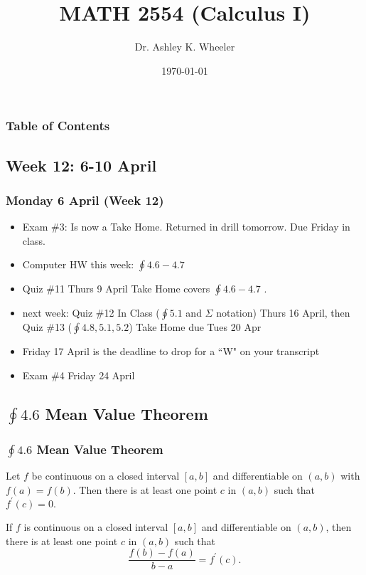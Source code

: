 \documentclass[14pt]{beamer}
\title[Cal I S2015]{MATH 2554 (Calculus I)}
\subtitle{}
\author[Wheeler]{Dr. Ashley K. Wheeler}
\institute{University of Arkansas}
\date{\today}
\begin{document}
\maketitle

\begin{frame}
\frametitle{Table of Contents}
\tableofcontents
\end{frame}


\begin{frame}
\section[Week 12]{Week 12: 6-10 April}
\frametitle{Monday 6 April (Week 12)}
\small
\begin{itemize}
\item Exam \#3: Is now a Take Home.  Returned in drill tomorrow.  Due Friday in class.
\item Computer HW this week: $\oint 4.6-4.7$ 	
\item Quiz \#11 Thurs 9 April Take Home covers $\oint 4.6-4.7$ .
\item next week: Quiz \#12 In Class ($\oint 5.1$ and $\Sigma$ notation) Thurs 16 April, then Quiz \#13 ($\oint 4.8, 5.1, 5.2$) Take Home due Tues 20 Apr
\item \alert{Friday 17 April is the deadline to drop for a ``W" on your transcript}
\item Exam \#4 Friday 24 April
\end{itemize}
\end{frame}

\begin{frame}
\subsection[$\oint 4.6$ Mean Value Theorem]{$\oint 4.6$ Mean Value Theorem}
\frametitle{$\oint 4.6$ Mean Value Theorem}
\small 
\begin{thm}  Let $f$ be continuous on a closed interval $[a,b]$ and differentiable on $(a,b)$ with $f(a)=f(b)$.  Then there is at least one point $c$ in $(a,b)$ such that $f^{\prime}(c)=0.$ \end{thm}

\vspace{1pc}
\begin{thm}  If $f$ is continuous on a closed interval $[a,b]$ and differentiable on $(a,b)$, then there is at least one point $c$ in $(a,b)$ such that 
$$\frac{f(b)-f(a)}{b-a}=f^{\prime}(c).$$
\end{thm}
\end{frame}
\end{document}
